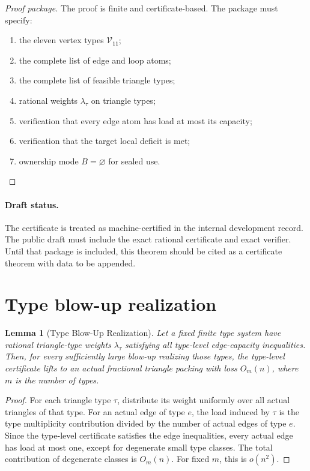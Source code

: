 \documentclass[11pt]{article}
\newtheorem{lemma}[theorem]{Lemma}
\theoremstyle{definition}
\newcommand{\calV}{\mathcal V}
\begin{document}
\begin{proof}[Proof package]
The proof is finite and certificate-based. The package must specify:
\begin{enumerate}[label=(\roman*)]
    \item the eleven vertex types \(\calV_{11}\);
    \item the complete list of edge and loop atoms;
    \item the complete list of feasible triangle types;
    \item rational weights \(\lambda_\tau\) on triangle types;
    \item verification that every edge atom has load at most its capacity;
    \item verification that the target local deficit is met;
    \item ownership mode \(B=\varnothing\) for sealed use.
\end{enumerate}
\end{proof}

\paragraph{Draft status.}
The certificate is treated as machine-certified in the internal development record. The public draft must include the exact rational certificate and exact verifier. Until that package is included, this theorem should be cited as a certificate theorem with data to be appended.

\section{Type blow-up realization}

\begin{lemma}[Type Blow-Up Realization]\label{lem:type-blowup}
Let a fixed finite type system have rational triangle-type weights \(\lambda_\tau\) satisfying all type-level edge-capacity inequalities. Then, for every sufficiently large blow-up realizing those types, the type-level certificate lifts to an actual fractional triangle packing with loss \(O_m(n)\), where \(m\) is the number of types.
\end{lemma}

\begin{proof}
For each triangle type \(\tau\), distribute its weight uniformly over all actual triangles of that type. For an actual edge of type \(e\), the load induced by \(\tau\) is the type multiplicity contribution divided by the number of actual edges of type \(e\). Since the type-level certificate satisfies the edge inequalities, every actual edge has load at most one, except for degenerate small type classes. The total contribution of degenerate classes is \(O_m(n)\). For fixed \(m\), this is \(o(n^2)\).
\end{proof}
\end{document}

